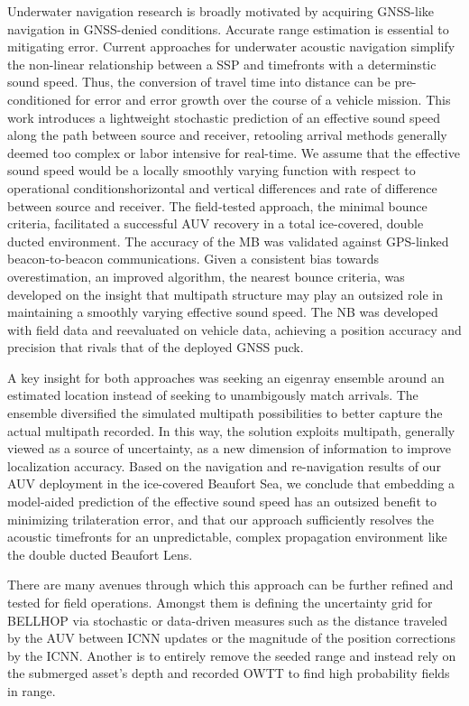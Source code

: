 Underwater navigation research is broadly motivated by acquiring GNSS-like navigation in GNSS-denied conditions.
Accurate range estimation is essential to mitigating error.
Current approaches for underwater acoustic navigation simplify the non-linear relationship between a SSP and timefronts with a determinstic sound speed.
Thus, the conversion of travel time into distance can be pre-conditioned for error and error growth over the course of a vehicle mission.
This work introduces a lightweight stochastic prediction of an effective sound speed along the path between source and receiver, retooling arrival methods generally deemed too complex or labor intensive for real-time.
We assume that the effective sound speed would be a locally smoothly varying function with respect to operational conditions\textemdash horizontal and vertical differences and rate of difference between source and receiver.
The field-tested approach, the minimal bounce criteria, facilitated a successful AUV recovery in a total ice-covered, double ducted environment.
The accuracy of the MB was validated against GPS-linked beacon-to-beacon communications.
Given a consistent bias towards overestimation, an improved algorithm, the nearest bounce criteria, was developed on the insight that multipath structure may play an outsized role in maintaining a smoothly varying effective sound speed.
The NB was developed with field data and reevaluated on vehicle data, achieving a position accuracy and precision that rivals that of the deployed GNSS puck.

A key insight for both approaches was seeking an eigenray ensemble around an estimated location instead of seeking to unambigously match arrivals.
The ensemble diversified the simulated multipath possibilities to better capture the actual multipath recorded.
In this way, the solution exploits multipath, generally viewed as a source of uncertainty, as a new dimension of information to improve localization accuracy.
Based on the navigation and re-navigation results of our AUV deployment in the ice-covered Beaufort Sea, we conclude that embedding a model-aided prediction of the effective sound speed has an outsized benefit to minimizing trilateration error, and that our approach sufficiently resolves the acoustic timefronts for an unpredictable, complex propagation environment like the double ducted Beaufort Lens.

There are many avenues through which this approach can be further refined and tested for field operations.
Amongst them is defining the uncertainty grid for BELLHOP via stochastic or data-driven measures such as the distance traveled by the AUV between ICNN updates or the magnitude of the position corrections by the ICNN.
Another is to entirely remove the seeded range and instead rely on the submerged asset's depth and recorded OWTT to find high probability fields in range.

